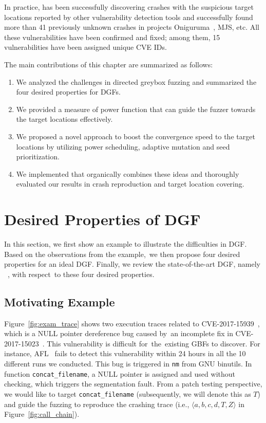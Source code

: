 In practice, \dFOT has been successfully discovering crashes with the suspicious target locations reported by other vulnerability detection tools and successfully found more than 41 previously unknown crashes in projects Oniguruma~\cite{oniguruma}, MJS\cite{mjs}, etc. All these vulnerabilities have been confirmed and fixed; among them, 15 vulnerabilities have been assigned unique CVE IDs.

The main contributions of this chapter are summarized as follows:
\begin{enumerate}[1)] 
\itemsep0em
\item We analyzed the challenges in directed greybox fuzzing and summarized the four desired properties for DGFs.
\item We provided a measure of power function that can guide the fuzzer towards the target locations effectively.
\item We proposed a novel approach to boost the convergence speed to the target locations by utilizing power scheduling, adaptive mutation and seed prioritization.
\item We implemented \dFOT that organically combines these ideas and thoroughly evaluated our results in crash reproduction and target location covering.
\end{enumerate} 

\section{Desired Properties of DGF}\label{sec:mx}

In this section, we first show an example to illustrate the difficulties in DGF.
Based on the observations from the example,~we then propose four desired properties for an ideal DGF.
Finally, we review the state-of-the-art DGF, namely \aflgo~\cite{Bohme:2017:DGF}, with respect~to these four desired properties. 


\subsection{Motivating Example}\label{subsec:motiv}



Figure~\ref{fig:exam_trace} shows two execution traces related to CVE-2017-15939~\cite{cve-2017-15939}, which is a NULL pointer dereference bug caused by~an incomplete fix in CVE-2017-15023~\cite{cve_2017_15023}.
This vulnerability is difficult for~the~existing GBFs to discover.
For instance, AFL~\cite{afl} fails to detect this vulnerability within 24 hours in all the 10 different runs we conducted.
This bug is triggered in \texttt{nm} from GNU binutils.
In function \texttt{concat\_filename}, a NULL pointer is assigned and used without checking, which triggers the segmentation fault.
From a patch testing perspective, we would like to target \texttt{concat\_filename} (subsequently, we will denote this as $T$) and guide the fuzzing to reproduce the crashing trace (i.e., $\langle a, b, c, d, T, Z\rangle$ in Figure~\ref{fig:call_chain}).




